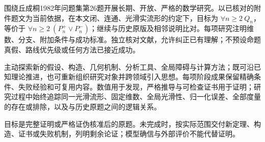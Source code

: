 \documentclass[11pt,a4paper]{article}
\theoremstyle{definition}
\begin{document}
围绕丘成桐1982年问题集第26题开展长期、开放、严格的数学研究。以已核对的附件题文为当前依据，在本文闭、连通、光滑实流形的约定下，目标为 $\forall n\ge2\ Q_n$，等价于 $\forall n\ge2\ (P_n^+\vee P_n^-)$；继续与历史原版及相邻说明比对。每项研究注明维数、分支、附加条件与成功标准。独立核对文献，允许纠正已有理解；不预设命题真假、路线优先级或任何方法已接近成功。

主动探索新的假设、构造、几何机制、分析工具、全局障碍与计算方法；既可沿已知理论推进，也可重新组织研究对象并跨领域引入思想。每项阶段成果保留精确条件、失败经验和可复用内容。数值用于发现，严格推导与可检查证书用于证明；研究过程中始终追踪同一光滑流形、固定维数、全局光滑性、归一化误差、全部度量的存在或排除，以及与历史原题之间的逻辑关系。

目标是完整证明或严格证伪核准后的原题。未完成时，按实际范围交付新定理、构造、证书或失败机制，列明剩余论证；模型确信与外部评价不能代替证明。

\newpage
\end{document}
